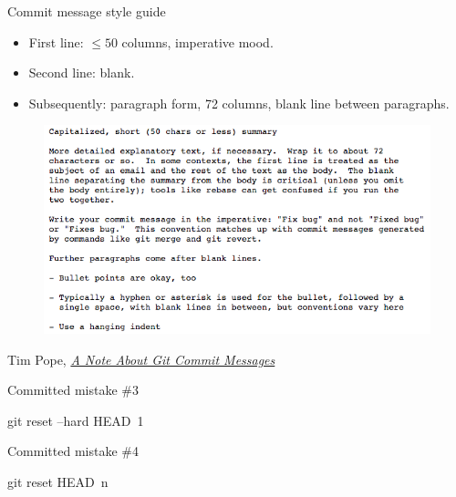 \begin{frame}{Commit message style guide}
  \begin{itemize}
    \item First line: $ \le 50 $ columns, imperative mood.
    \item Second line: blank.
    \item Subsequently: paragraph form, 72 columns, blank line between
          paragraphs.
  \end{itemize}

  \begin{figure}
    \includegraphics[scale=0.35]{pope_commit_message.png}
  \end{figure}
  \footnotesize{Tim Pope,
    \href{http://tbaggery.com/2008/04/19/a-note-about-git-commit-messages.html}
         {\emph{A Note About Git Commit Messages}}}
\end{frame}

\begin{frame}[fragile]{Committed mistake \#3}
  \color{ucMaroon}{I wish the last commit never happened. Can I throw it away?}

  \begin{gitCommand}git reset --hard HEAD~1\end{gitCommand}
\end{frame}

\begin{frame}[fragile]{Committed mistake \#4}
  \color{ucMaroon}{I wish the last $ n $ commits never happened, but I want
  to keep the current stuff in the working tree.}

  \begin{gitCommand}git reset HEAD~n\end{gitCommand}
\end{frame}

